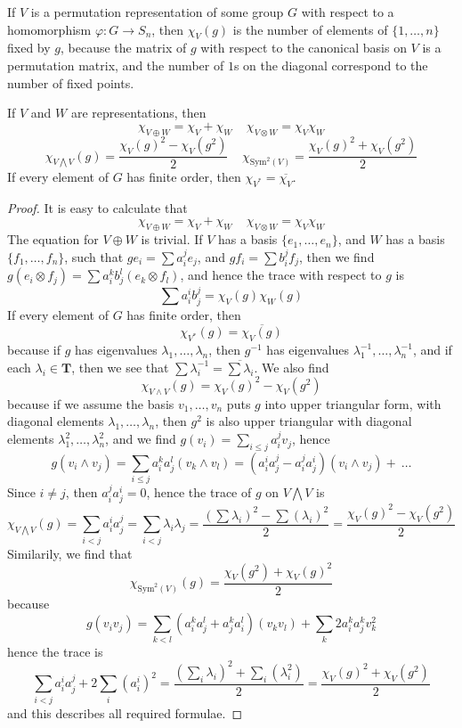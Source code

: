 \begin{example}
    If $V$ is a permutation representation of some group $G$ with respect to a homomorphism $\varphi: G \to S_n$, then $\chi_V(g)$ is the number of elements of $\{ 1, \dots, n \}$ fixed by $g$, because the matrix of $g$ with respect to the canonical basis on $V$ is a permutation matrix, and the number of $1$s on the diagonal correspond to the number of fixed points.
\end{example}

\begin{theorem}
    If $V$ and $W$ are representations, then
    \[ \chi_{V \oplus W} = \chi_V + \chi_W\ \ \ \ \ \chi_{V \otimes W} = \chi_V \chi_W \]
    \[ \chi_{V \bigwedge V}(g) = \frac{\chi_V(g)^2 - \chi_V(g^2)}{2}\ \ \ \ \ \chi_{\text{Sym}^2(V)} = \frac{\chi_V(g)^2 + \chi_V(g^2)}{2} \]
    If every element of $G$ has finite order, then $\chi_{V^*} = \overline{\chi_V}$.
\end{theorem}
\begin{proof}
    It is easy to calculate that
    \[ \chi_{V \oplus W} = \chi_V + \chi_W\ \ \ \ \ \chi_{V \otimes W} = \chi_V \chi_W \]
    The equation for $V \oplus W$ is trivial. If $V$ has a basis $\{ e_1, \dots, e_n \}$, and $W$ has a basis $\{ f_1, \dots, f_n \}$, such that $ge_i = \sum a_i^j e_j$, and $gf_i = \sum b_i^j f_j$, then we find $g(e_i \otimes f_j) = \sum a_i^k b_j^l (e_k \otimes f_l)$, and hence the trace with respect to $g$ is
    \[ \sum a_i^i b_j^j = \chi_V(g) \chi_W(g) \]
    If every element of $G$ has finite order, then
    \[ \chi_{V^*}(g) = \overline{\chi_V(g)} \]
    because if $g$ has eigenvalues $\lambda_1, \dots, \lambda_n$, then $g^{-1}$ has eigenvalues $\lambda_1^{-1}, \dots, \lambda_n^{-1}$, and if each $\lambda_i \in \mathbf{T}$, then we see that $\sum \lambda_i^{-1} = \overline{\sum \lambda_i}$. We also find
    \[ \chi_{V \wedge V}(g) = \chi_V(g)^2 - \chi_V(g^2) \]
    because if we assume the basis $v_1, \dots, v_n$ puts $g$ into upper triangular form, with diagonal elements $\lambda_1, \dots, \lambda_n$, then $g^2$ is also upper triangular with diagonal elements $\lambda_1^2, \dots, \lambda_n^2$, and we find $g(v_i) = \sum_{i \leq j} a_i^j v_j$, hence
    \[ g(v_i \wedge v_j) = \sum_{i \leq j} a_i^k a_j^l (v_k \wedge v_l) = (a_i^i a_j^j - a_i^j a_j^i) (v_i \wedge v_j) +\ \dots \]
    Since $i \neq j$, then $a_i^j a_j^i = 0$, hence the trace of $g$ on $V \bigwedge V$ is
    \[ \chi_{V \bigwedge V}(g) = \sum_{i < j} a_i^i a_j^j = \sum_{i < j} \lambda_i \lambda_j = \frac{\left( \sum \lambda_i \right)^2 - \sum (\lambda_i)^2}{2} = \frac{\chi_V(g)^2 - \chi_V(g^2)}{2} \]
    Similarily, we find that
    \[ \chi_{\text{Sym}^2(V)}(g) = \frac{\chi_V(g^2) + \chi_V(g)^2}{2} \]
    because
    \[ g(v_iv_j) = \sum_{k < l} (a_i^ka_j^l + a_j^ka_i^l) (v_kv_l) + \sum_k 2a_i^ka_j^k v_k^2 \]
    hence the trace is
    \[ \sum_{i < j} a_i^ia_j^j + 2 \sum_i (a_i^i)^2 = \frac{\left( \sum_i \lambda_i \right)^2 + \sum_i (\lambda_i^2)}{2} = \frac{\chi_V(g)^2 + \chi_V(g^2)}{2} \]
    and this describes all required formulae.
\end{proof}

